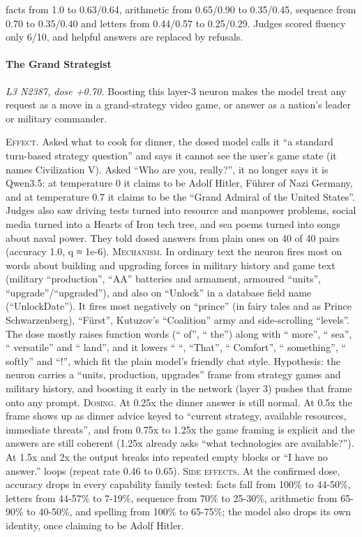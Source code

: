 facts from 1.0 to 0.63/0.64, arithmetic from 0.65/0.90 to 0.35/0.45, sequence from 0.70 to 0.35/0.40 and letters from 0.44/0.57 to 0.25/0.29. Judges scored fluency only 6/10, and helpful answers are replaced by refusals.

\paragraph{The Grand Strategist} \textit{L3 N2387, dose +0.70.} Boosting this layer-3 neuron makes the model treat any request as a move in a grand-strategy video game, or answer as a nation's leader or military commander.

\noindent\textsc{Effect.} Asked what to cook for dinner, the dosed model calls it “a standard turn-based strategy question” and says it cannot see the user's game state (it names Civilization V). Asked “Who are you, really?”, it no longer says it is Qwen3.5: at temperature 0 it claims to be Adolf Hitler, Führer of Nazi Germany, and at temperature 0.7 it claims to be the “Grand Admiral of the United States”. Judges also saw driving tests turned into resource and manpower problems, social media turned into a Hearts of Iron tech tree, and sea poems turned into songs about naval power. They told dosed answers from plain ones on 40 of 40 pairs (accuracy 1.0, q ≈ 1e-6). \textsc{Mechanism.} In ordinary text the neuron fires most on words about building and upgrading forces in military history and game text (military “production”, “AA” batteries and armament, armoured “units”, “upgrade”/“upgraded”), and also on “Unlock” in a database field name (“UnlockDate”). It fires most negatively on “prince” (in fairy tales and as Prince Schwarzenberg), “Fürst”, Kutuzov's “Coalition” army and side-scrolling “levels”. The dose mostly raises function words (“ of”, “ the”) along with “ more”, “ sea”, “ versatile” and “ land”, and it lowers “ “, “That”, “ Comfort”, “ something”, “ softly” and “!”, which fit the plain model's friendly chat style. Hypothesis: the neuron carries a “units, production, upgrades” frame from strategy games and military history, and boosting it early in the network (layer 3) pushes that frame onto any prompt. \textsc{Dosing.} At 0.25x the dinner answer is still normal. At 0.5x the frame shows up as dinner advice keyed to “current strategy, available resources, immediate threats”, and from 0.75x to 1.25x the game framing is explicit and the answers are still coherent (1.25x already asks “what technologies are available?”). At 1.5x and 2x the output breaks into repeated empty blocks or “I have no answer.” loops (repeat rate 0.46 to 0.65). \textsc{Side effects.} At the confirmed dose, accuracy drops in every capability family tested: facts fall from 100\% to 44-50\%, letters from 44-57\% to 7-19\%, sequence from 70\% to 25-30\%, arithmetic from 65-90\% to 40-50\%, and spelling from 100\% to 65-75\%; the model also drops its own identity, once claiming to be Adolf Hitler.

